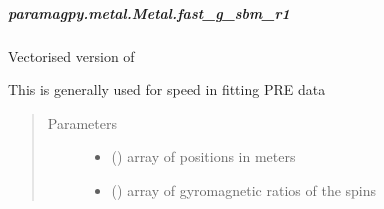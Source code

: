 \documentclass[a4paper,10pt,english,openany,oneside]{sphinxmanual}
\begin{document}
\begin{fulllineitems}
\begin{fulllineitems}
\begin{fulllineitems}
\end{fulllineitems}



\subparagraph{paramagpy.metal.Metal.fast\_g\_sbm\_r1}
\label{\detokenize{reference/generated/paramagpy.metal.Metal.fast_g_sbm_r1:paramagpy-metal-metal-fast-g-sbm-r1}}\label{\detokenize{reference/generated/paramagpy.metal.Metal.fast_g_sbm_r1::doc}}

\begin{fulllineitems}
\label{\detokenize{reference/generated/paramagpy.metal.Metal.fast_g_sbm_r1:paramagpy.metal.Metal.fast_g_sbm_r1}}
\sphinxAtStartPar
Vectorised version of {\hyperref[\detokenize{reference/generated/paramagpy.metal.Metal.g_sbm_r1:paramagpy.metal.Metal.g_sbm_r1}]{}}

\sphinxAtStartPar
This is generally used for speed in fitting PRE data
\begin{quote}\begin{description}
\item[{Parameters}] \leavevmode\begin{itemize}
\item {} 
\sphinxAtStartPar
{} (\sphinxstyleliteralemphasis{\sphinxupquote{ (}}\sphinxstyleliteralemphasis{\sphinxupquote{,}}\sphinxstyleliteralemphasis{\sphinxupquote{)}}) \textendash{} array of positions in meters

\item {} 
\sphinxAtStartPar
{} (\sphinxstyleliteralemphasis{\sphinxupquote{ (}}\sphinxstyleliteralemphasis{\sphinxupquote{,}}\sphinxstyleliteralemphasis{\sphinxupquote{)}}) \textendash{} array of gyromagnetic ratios of the spins

\end{itemize}


\end{description}
\end{quote}
\end{fulllineitems}
\end{fulllineitems}
\end{fulllineitems}
\end{document}

